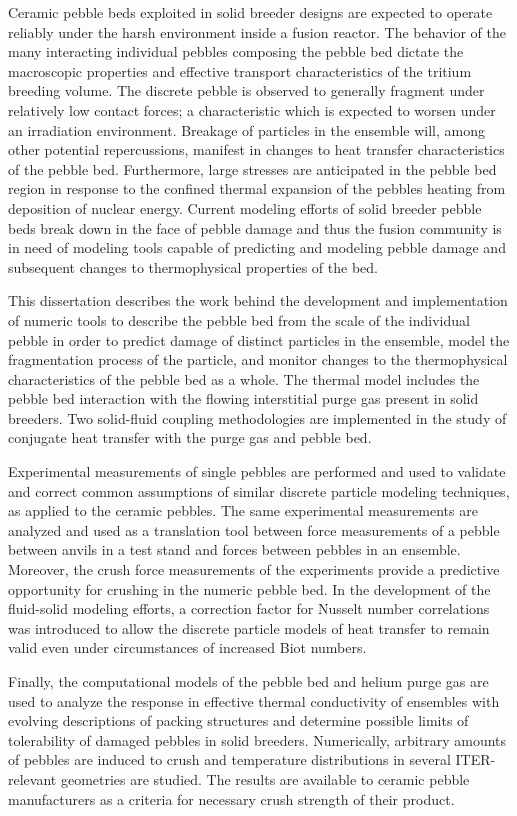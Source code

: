 Ceramic pebble beds exploited in solid breeder designs are expected to operate reliably under the harsh environment inside a fusion reactor. The behavior of the many interacting individual pebbles composing the pebble bed dictate the macroscopic properties and effective transport characteristics of the tritium breeding volume. The discrete pebble is observed to generally fragment under relatively low contact forces; a characteristic which is expected to worsen under an irradiation environment. Breakage of particles in the ensemble will, among other potential repercussions, manifest in changes to heat transfer characteristics of the pebble bed. Furthermore, large stresses are anticipated in the pebble bed region in response to the confined thermal expansion of the pebbles heating from deposition of nuclear energy. Current modeling efforts of solid breeder pebble beds break down in the face of pebble damage and thus the fusion community is in need of modeling tools capable of predicting and modeling pebble damage and subsequent changes to thermophysical properties of the bed.

This dissertation describes the work behind the development and implementation of numeric tools to describe the pebble bed from the scale of the individual pebble in order to predict damage of distinct particles in the ensemble, model the fragmentation process of the particle, and monitor changes to the thermophysical characteristics of the pebble bed as a whole. The thermal model includes the pebble bed interaction with the flowing interstitial purge gas present in solid breeders. Two solid-fluid coupling methodologies are implemented in the study of conjugate heat transfer with the purge gas and pebble bed.

Experimental measurements of single pebbles are performed and used to validate and correct common assumptions of similar discrete particle modeling techniques, as applied to the ceramic pebbles. The same experimental measurements are analyzed and used as a translation tool between force measurements of a pebble between anvils in a test stand and forces between pebbles in an ensemble. Moreover, the crush force measurements of the experiments provide a predictive opportunity for crushing in the numeric pebble bed. In the development of the fluid-solid modeling efforts, a correction factor for Nusselt number correlations was introduced to allow the discrete particle models of heat transfer to remain valid even under circumstances of increased Biot numbers.

Finally, the computational models of the pebble bed and helium purge gas are used to analyze the response in effective thermal conductivity of ensembles with evolving descriptions of packing structures and determine possible limits of tolerability of damaged pebbles in solid breeders. Numerically, arbitrary amounts of pebbles are induced to crush and temperature distributions in several ITER-relevant geometries are studied. The results are available to ceramic pebble manufacturers as a criteria for necessary crush strength of their product. 